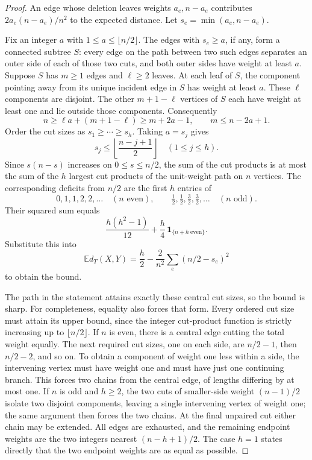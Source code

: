 \documentclass[11pt,a4paper]{article}
\theoremstyle{remark}\newtheorem{remark}[theorem]{Remark}
\begin{document}
\begin{proof}
An edge whose deletion leaves weights $a_e,n-a_e$ contributes
$2a_e(n-a_e)/n^2$ to the expected distance. Let
$s_e=\min(a_e,n-a_e)$.

Fix an integer $a$ with $1\le a\le\lfloor n/2\rfloor$. The edges with
$s_e\ge a$, if any, form a connected subtree $S$: every edge on the path
between two such edges separates an outer side of each of those two cuts,
and both outer sides have weight at least $a$. Suppose $S$ has $m\ge1$
edges and $\ell\ge2$ leaves. At each leaf of $S$, the component pointing
away from its unique incident edge in $S$ has weight at least $a$. These
$\ell$ components are disjoint. The other $m+1-\ell$ vertices of $S$
each have weight at least one and lie outside those components. Consequently
\[
 n\ge \ell a+(m+1-\ell)\ge m+2a-1,
 \qquad m\le n-2a+1.
\]
Order the cut sizes as $s_1\ge\cdots\ge s_h$. Taking $a=s_j$ gives
\[
 s_j\le \left\lfloor\frac{n-j+1}{2}\right\rfloor
       \quad(1\le j\le h).
\]
Since $s(n-s)$ increases on $0\le s\le n/2$, the sum of the cut products
is at most the sum of the $h$ largest cut products of the unit-weight path
on $n$ vertices. The corresponding deficits from $n/2$ are the first $h$
entries of
\[
 0,1,1,2,2,\ldots\quad(n\text{ even}),
 \qquad
 \tfrac12,\tfrac12,\tfrac32,\tfrac32,\ldots\quad(n\text{ odd}).
\]
Their squared sum equals
\[
 \frac{h(h^2-1)}{12}
   +\frac h4\,\boldsymbol{1}_{\{n+h\ \text{even}\}}.
\]
Substitute this into
\[
 \mathbb E d_T(X,Y)
   =\frac h2-\frac2{n^2}\sum_e(n/2-s_e)^2
\]
to obtain the bound.

The path in the statement attains exactly these central cut sizes, so the
bound is sharp. For completeness, equality also forces that form. Every
ordered cut size must attain its upper bound, since the integer cut-product
function is strictly increasing up to $\lfloor n/2\rfloor$. If $n$ is even,
there is a central edge cutting the total weight equally. The next required
cut sizes, one on each side, are $n/2-1$, then $n/2-2$, and so on. To obtain
a component of weight one less within a side, the intervening vertex must
have weight one and must have just one continuing branch. This forces two
chains from the central edge, of lengths differing by at most one. If $n$
is odd and $h\ge2$, the two cuts of smaller-side weight $(n-1)/2$ isolate
two disjoint components, leaving a single intervening vertex of weight one;
the same argument then forces the two chains. At the final unpaired cut
either chain may be extended. All edges are exhausted, and the remaining
endpoint weights are the two integers nearest $(n-h+1)/2$. The case $h=1$
states directly that the two endpoint weights are as equal as possible.
\end{proof}
\end{document}
